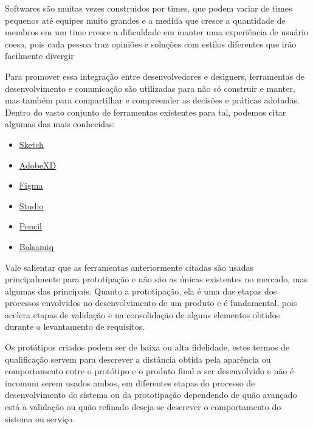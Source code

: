   Softwares são muitas vezes construidos por times, que podem variar de times pequenos até equipes muito grandes e a medida que cresce a quantidade de membros em um time cresce a dificuldade em manter uma experiência de usuário coesa, pois cada pessoa traz opiniões e soluções com estilos diferentes que irão facilmente divergir \cite{airbnb_medium}

  Para promover essa integração entre desenvolvedores e designers, ferramentas de desenvolvimento e comunicação são utilizadas para não só construir e manter, mas também para compartilhar e compreender as decisões e práticas adotadas. Dentro do vasto conjunto de ferramentas existentes para tal, podemos citar algumas das mais conhecidas:

\begin{itemize}
  \item \href{https://www.sketch.com}{Sketch}
  \item \href{https://www.adobe.com/br/products/xd.html?promoid=3NQZBBTZ&mv=other}{AdobeXD}
  \item \href{https://www.figma.com/}{Figma}
  \item \href{https://www.invisionapp.com/studio}{Studio}
  \item \href{https://pencil.evolus.vn/}{Pencil}
  \item \href{https://balsamiq.com/wireframes/}{Balsamiq}
\end{itemize}

  Vale salientar que as ferramentas anteriormente citadas são usadas principalmente para prototipação e não são as únicas existentes no mercado, mas algumas das principais. Quanto a prototipação, ela é uma das etapas dos processos envolvidos no desenvolvimento de um produto e é fundamental, pois acelera etapas de validação e na consolidação de alguns elementos obtidos durante o levantamento de requisitos.

  Os protótipos criados podem ser de baixa ou alta fidelidade, estes termos de qualificação servem para descrever a distância obtida pela aparência ou comportamento entre o protótipo e o produto final a ser desenvolvido e não é incomum serem usados ambos, em diferentes etapas do processo de desenvolvimento do sistema ou da prototipação dependendo de quão avançado está a validação ou quão refinado deseja-se descrever o comportamento do sistema ou serviço.

